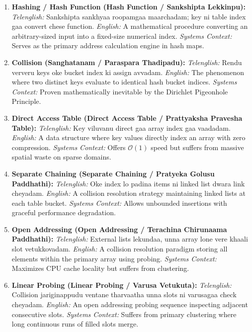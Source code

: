 \documentclass[10pt,twocolumn,letterpaper]{article}
\begin{document}
\begin{enumerate}
    \item \textbf{Hashing / Hash Function (Hash Function / Sankshipta Lekkinpu):}
    \textit{Telenglish:} Sankshipta sankhyaa roopamgaa maarchadam; key ni table index gaa convert chese function.
    \textit{English:} A mathematical procedure converting an arbitrary-sized input into a fixed-size numerical index.
    \textit{Systems Context:} Serves as the primary address calculation engine in hash maps.

    \item \textbf{Collision (Sanghatanam / Paraspara Thadipadu):}
    \textit{Telenglish:} Rendu ververu keys oke bucket index ki assign avvadam.
    \textit{English:} The phenomenon where two distinct keys evaluate to identical hash bucket indices.
    \textit{Systems Context:} Proven mathematically inevitable by the Dirichlet Pigeonhole Principle.

    \item \textbf{Direct Access Table (Direct Access Table / Prattyaksha Pravesha Table):}
    \textit{Telenglish:} Key viluvanu direct gaa array index gaa vaadadam.
    \textit{English:} A data structure where key values directly index an array with zero compression.
    \textit{Systems Context:} Offers $\mathcal{O}(1)$ speed but suffers from massive spatial waste on sparse domains.

    \item \textbf{Separate Chaining (Separate Chaining / Pratyeka Golusu Paddhathi):}
    \textit{Telenglish:} Oke index lo padina items ni linked list dwara link cheyadam.
    \textit{English:} A collision resolution strategy maintaining linked lists at each table bucket.
    \textit{Systems Context:} Allows unbounded insertions with graceful performance degradation.

    \item \textbf{Open Addressing (Open Addressing / Terachina Chirunaama Paddhathi):}
    \textit{Telenglish:} External lists lekundaa, unna array lone vere khaali slot vetukkovadam.
    \textit{English:} A collision resolution paradigm storing all elements within the primary array using probing.
    \textit{Systems Context:} Maximizes CPU cache locality but suffers from clustering.

    \item \textbf{Linear Probing (Linear Probing / Varusa Vetukuta):}
    \textit{Telenglish:} Collision jariginappudu ventane tharvaatha unna slots ni varusagaa check cheyadam.
    \textit{English:} An open addressing probing sequence inspecting adjacent consecutive slots.
    \textit{Systems Context:} Suffers from primary clustering where long continuous runs of filled slots merge.


\end{enumerate}
\end{document}
